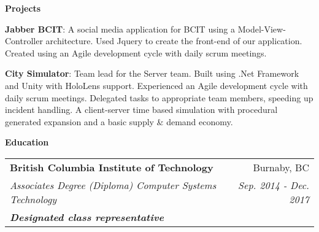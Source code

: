 \documentclass[letterpaper,11pt]{article}
\makeatletter
\newcommand{\resheading}[1]{{\large \colorbox{mygrey}{\begin{minipage}{\textwidth}{\textbf{#1 \vphantom{p\^{E}}}}\end{minipage}}}}
\newcommand{\ressubheading}[6]{
\begin{tabular*}{7.0in}{l@{\extracolsep{\fill}}r}
        \textbf{#1} & #2 \\
        \textit{#3} & \textit{#4} \\
        \textbf{\textit{\small#5}} & \small#6
\end{tabular*}\vspace{-6pt}}
\newcommand{\resumeSubItem}[2]{\resumeItem{#1}{#2}\vspace{-4pt}}
\newcommand{\resumeItem}[2]{
  \item\small{
    \textbf
    {#1}{: #2 \vspace{-2pt}}
  }
}
\makeatother
\begin{document}
\vspace{0.05in}
\resheading{Projects}
\begin{description}
\resumeSubItem{Jabber BCIT}
{A social media application for BCIT using a Model-View-Controller architecture. Used Jquery to create the front-end of our application. Created using an Agile development cycle with daily scrum meetings.}
\resumeSubItem{City Simulator}
{Team lead for the Server team. Built using .Net Framework and Unity with HoloLens support. Experienced an Agile development cycle with daily scrum meetings. Delegated tasks to appropriate team members, speeding up incident handling. A client-server time based simulation with procedural generated expansion and a basic supply \& demand economy.}
\end{description}
\vspace{0.05in}
\resheading{Education}
\begin{description}
\item
    \ressubheading{British Columbia Institute of Technology}{Burnaby, BC}{Associate\textsc{\char13}s Degree (Diploma) Computer Systems Technology}{Sep. 2014 - Dec. 2017}{Designated class representative}{}
\end{description}
\pagebreak
\end{document}

